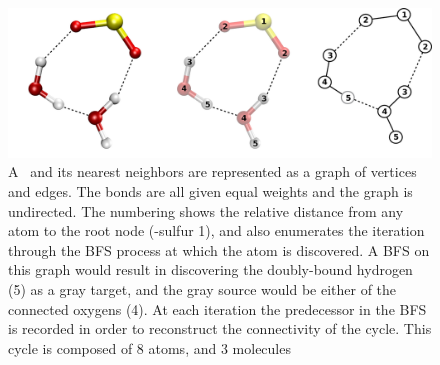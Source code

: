 \begin{figure}[h!]
	\begin{center}
		\includegraphics[scale=1.0]{images/so2complexfigure.png}
		\caption{A \suldiox~and its nearest neighbors are represented as a graph of vertices and edges. The bonds are all given equal weights and the graph is undirected. The numbering shows the relative distance from any atom to the root node (\suldiox-sulfur 1), and also enumerates the iteration through the BFS process at which the atom is discovered. A BFS on this graph would result in discovering the doubly-bound hydrogen (5) as a gray target, and the gray source would be either of the connected oxygens (4). At each iteration the predecessor in the BFS is recorded in order to reconstruct the connectivity of the cycle. This cycle is composed of 8 atoms, and 3 molecules}
		\label{fig:so2-complex-graph}
	\end{center}
\end{figure}
